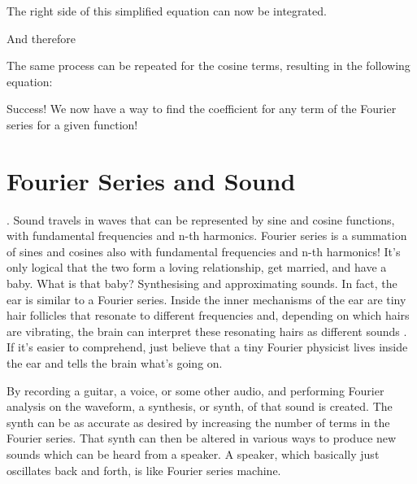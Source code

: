 \documentclass{tufte-handout}
\begin{document}

The right side of this simplified equation can now be integrated.
	

And therefore
	

The same process can be repeated for the cosine terms, resulting in the following equation:


Success! We now have a way to find the coefficient for any term of the Fourier series for a given function!

\section{Fourier Series and Sound}
. Sound travels in waves that can be represented by sine and cosine functions, with fundamental frequencies and n-th harmonics. Fourier series is a summation of sines and cosines also with fundamental frequencies and n-th harmonics! It's only logical that the two form a loving relationship, get married, and have a baby. What is that baby? Synthesising and approximating sounds. In fact, the ear is similar to a Fourier series. Inside the inner mechanisms of the ear are tiny hair follicles that resonate to different frequencies and, depending on which hairs are vibrating, the brain can interpret these resonating hairs as different sounds \cite{Ear}. If it's easier to comprehend, just believe that a tiny Fourier physicist lives inside the ear and tells the brain what's going on.

By recording a guitar, a voice, or some other audio, and performing Fourier analysis on the waveform, a synthesis, or synth, of that sound is created. The synth can be as accurate as desired by increasing the number of terms in the Fourier series. That synth can then be altered in various ways to produce new sounds which can be heard from a speaker. A speaker, which basically just oscillates back and forth, is like Fourier series machine.
	
\end{document}
